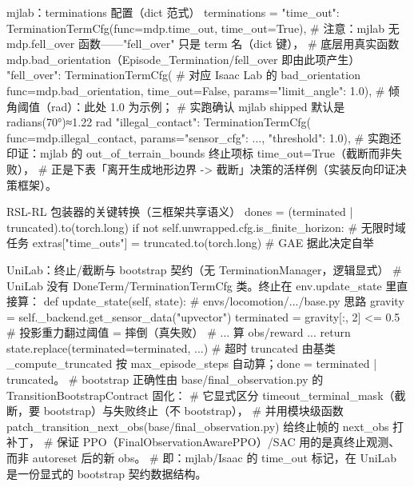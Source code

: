\begin{codebox}[Python]{mjlab：terminations 配置（dict 范式）}
terminations = {
    "time_out": TerminationTermCfg(func=mdp.time_out, time_out=True),
    # 注意：mjlab 无 mdp.fell_over 函数——"fell_over" 只是 term 名（dict 键），
    #   底层用真实函数 mdp.bad_orientation（Episode_Termination/fell_over 即由此项产生）
    "fell_over": TerminationTermCfg(            # 对应 Isaac Lab 的 bad_orientation
        func=mdp.bad_orientation, time_out=False,
        params={"limit_angle": 1.0}),           # 倾角阈值（rad）：此处 1.0 为示例；
                                                #   实跑确认 mjlab shipped 默认是 radians(70°)≈1.22 rad
    "illegal_contact": TerminationTermCfg(
        func=mdp.illegal_contact,
        params={"sensor_cfg": ..., "threshold": 1.0}),
    # 实跑还印证：mjlab 的 out_of_terrain_bounds 终止项标 time_out=True（截断而非失败），
    #   正是下表「离开生成地形边界 -> 截断」决策的活样例（实装反向印证决策框架）。
}
\end{codebox}

\begin{codebox}[Python]{RSL-RL 包装器的关键转换（三框架共享语义）}
dones = (terminated | truncated).to(torch.long)
if not self.unwrapped.cfg.is_finite_horizon:                    # 无限时域任务
    extras["time_outs"] = truncated.to(torch.long)             # GAE 据此决定自举
\end{codebox}

\begin{codebox}[Python]{UniLab：终止/截断与 bootstrap 契约（无 TerminationManager，逻辑显式）}
# UniLab 没有 DoneTerm/TerminationTermCfg 类。终止在 env.update_state 里直接算：
def update_state(self, state):                           # envs/locomotion/.../base.py 思路
    gravity = self._backend.get_sensor_data("upvector")
    terminated = gravity[:, 2] <= 0.5                    # 投影重力翻过阈值 = 摔倒（真失败）
    # ... 算 obs/reward ...
    return state.replace(terminated=terminated, ...)
# 超时 truncated 由基类 _compute_truncated 按 max_episode_steps 自动算；done = terminated | truncated。
# bootstrap 正确性由 base/final_observation.py 的 TransitionBootstrapContract 固化：
#   它显式区分 timeout_terminal_mask（截断，要 bootstrap）与失败终止（不 bootstrap），
#   并用模块级函数 patch_transition_next_obs(base/final_observation.py) 给终止帧的 next_obs 打补丁，
#   保证 PPO（FinalObservationAwarePPO）/SAC 用的是真终止观测、而非 autoreset 后的新 obs。
# 即：mjlab/Isaac 的 time_out 标记，在 UniLab 是一份显式的 bootstrap 契约数据结构。
\end{codebox}

